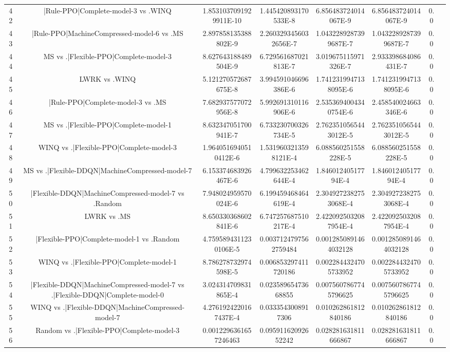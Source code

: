 \documentclass[a3paper,10pt]{article}
\begin{document}
\begin{table}[!htp]
\begin{tabular}{cccccccc}
42&|Rule-PPO|Complete-model-3 vs .WINQ&1.8531037091929911E-10&1.445420893170533E-8&6.856483724014067E-9&6.856483724014067E-9&0.0\\
43&|Rule-PPO|MachineCompressed-model-6 vs .MS&2.897858135388802E-9&2.2603293456032656E-7&1.0432289287399687E-7&1.0432289287399687E-7&0.0\\
44&MS vs .|Flexible-PPO|Complete-model-3&8.627643188489504E-9&6.729561687021813E-7&3.019675115971326E-7&2.933398684086431E-7&0.0\\
45&LWRK vs .WINQ&5.121270572687675E-8&3.994591046696386E-6&1.7412319947138095E-6&1.7412319947138095E-6&0.0\\
46&|Rule-PPO|Complete-model-3 vs .MS&7.682937577072956E-8&5.992691310116906E-6&2.5353694004340754E-6&2.458540024663346E-6&0.0\\
47&MS vs .|Flexible-PPO|Complete-model-1&8.632347051700941E-7&6.733230700326734E-5&2.7623510565443012E-5&2.7623510565443012E-5&0.0\\
48&WINQ vs .|Flexible-PPO|Complete-model-3&1.9640516940510412E-6&1.5319603213598121E-4&6.088560251558228E-5&6.088560251558228E-5&0.0\\
49&MS vs .|Flexible-DDQN|MachineCompressed-model-7&6.153374683926467E-6&4.799632253462644E-4&1.84601240517794E-4&1.84601240517794E-4&0.0\\
50&|Flexible-DDQN|MachineCompressed-model-7 vs .Random&7.948024959570024E-6&6.199459468464619E-4&2.3049272382753068E-4&2.3049272382753068E-4&0.0\\
51&LWRK vs .MS&8.650330368602841E-6&6.747257687510217E-4&2.4220925032087954E-4&2.4220925032087954E-4&0.0\\
52&|Flexible-PPO|Complete-model-1 vs .Random&4.7595894311230106E-5&0.0037124797562759484&0.0012850891464032128&0.0012850891464032128&0.0\\
53&WINQ vs .|Flexible-PPO|Complete-model-1&8.786278732974598E-5&0.006853297411720186&0.0022844324705733952&0.0022844324705733952&0.0\\
54&|Flexible-DDQN|MachineCompressed-model-7 vs .|Flexible-DDQN|Complete-model-0&3.024314709831865E-4&0.02358965473668855&0.0075607867745796625&0.0075607867745796625&0.0\\
55&WINQ vs .|Flexible-DDQN|MachineCompressed-model-7&4.2761924220167437E-4&0.0333543008917306&0.010262861812840186&0.010262861812840186&0.0\\
56&Random vs .|Flexible-PPO|Complete-model-3&0.0012296361657246463&0.09591162092652242&0.028281631811666867&0.028281631811666867&0.0\\

\end{tabular}
\end{table}
\end{document}
